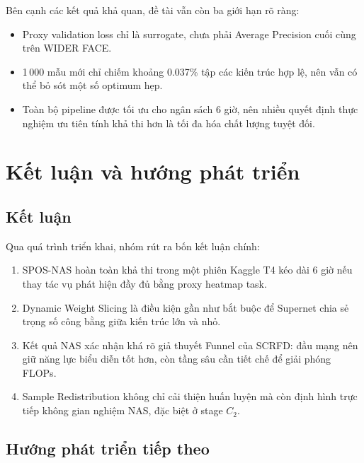 Bên cạnh các kết quả khả quan, đề tài vẫn còn ba giới hạn rõ ràng:
\begin{itemize}
  \item Proxy validation loss chỉ là surrogate, chưa phải Average Precision cuối cùng trên WIDER FACE.
  \item 1\,000 mẫu mới chỉ chiếm khoảng 0.037\% tập các kiến trúc hợp lệ, nên vẫn có thể bỏ sót một số optimum hẹp.
  \item Toàn bộ pipeline được tối ưu cho ngân sách 6 giờ, nên nhiều quyết định thực nghiệm ưu tiên tính khả thi hơn là tối đa hóa chất lượng tuyệt đối.
\end{itemize}

\chapter{Kết luận và hướng phát triển}

\section{Kết luận}

Qua quá trình triển khai, nhóm rút ra bốn kết luận chính:
\begin{enumerate}
  \item SPOS-NAS hoàn toàn khả thi trong một phiên Kaggle T4 kéo dài 6 giờ nếu thay tác vụ phát hiện đầy đủ bằng proxy heatmap task.
  \item Dynamic Weight Slicing là điều kiện gần như bắt buộc để Supernet chia sẻ trọng số công bằng giữa kiến trúc lớn và nhỏ.
  \item Kết quả NAS xác nhận khá rõ giả thuyết Funnel của SCRFD: đầu mạng nên giữ năng lực biểu diễn tốt hơn, còn tầng sâu cần tiết chế để giải phóng FLOPs.
  \item Sample Redistribution không chỉ cải thiện huấn luyện mà còn định hình trực tiếp không gian nghiệm NAS, đặc biệt ở stage \(C_2\).
\end{enumerate}

\section{Hướng phát triển tiếp theo}

